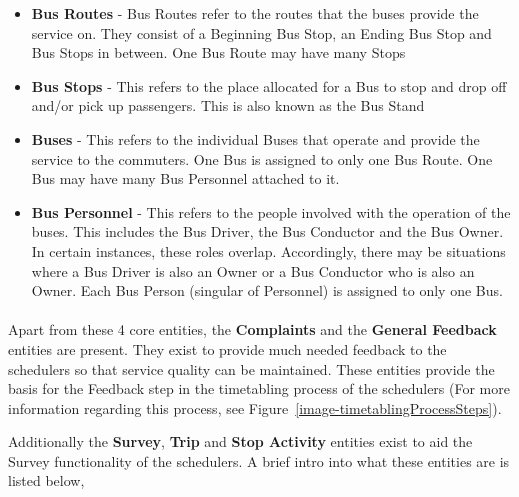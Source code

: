 \begin {itemize}
\item \textbf{Bus Routes} - Bus Routes refer to the routes that the buses provide the service on. They consist of a Beginning Bus Stop, an Ending Bus Stop and Bus Stops in between. One Bus Route may have many Stops
\item \textbf{Bus Stops} - This refers to the place allocated for a Bus to stop and drop off and/or pick up passengers. This is also known as the Bus Stand
\item \textbf{Buses} - This refers to the individual Buses that operate and provide the service to the commuters. One Bus is assigned to only one Bus Route. One Bus may have many Bus Personnel attached to it.
\item \textbf{Bus Personnel} - This refers to the people involved with the operation of the buses. This includes the Bus Driver, the Bus Conductor and the Bus Owner. In certain instances, these roles overlap. Accordingly, there may be situations where a Bus Driver is also an Owner or a Bus Conductor who is also an Owner. Each Bus Person (singular of Personnel) is assigned to only one Bus.
\end {itemize}

\paragraph{} Apart from these 4 core entities, the \textbf{Complaints} and the \textbf{General Feedback} entities are present. They exist to provide much needed feedback to the schedulers so that service quality can be maintained. These entities provide the basis for the Feedback step in the timetabling process of the schedulers (For more information regarding this process, see Figure~\ref{image-timetablingProcessSteps}).

Additionally the \textbf{Survey}, \textbf{Trip} and \textbf{Stop Activity} entities exist to aid the Survey functionality of the schedulers. A brief intro into what these entities are is listed below,

